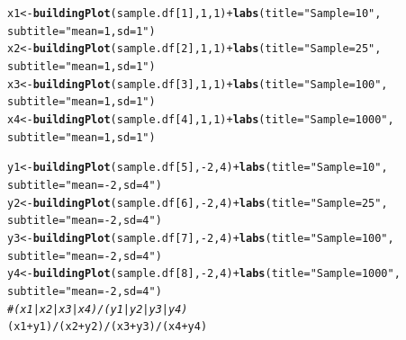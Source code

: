 \documentclass{article}\usepackage[]{graphicx}\usepackage[]{color}
\makeatletter
\newcommand{\hlnum}[1]{\textcolor[rgb]{0.686,0.059,0.569}{#1}}%
\newcommand{\hlstr}[1]{\textcolor[rgb]{0.192,0.494,0.8}{#1}}%
\newcommand{\hlcom}[1]{\textcolor[rgb]{0.678,0.584,0.686}{\textit{#1}}}%
\newcommand{\hlopt}[1]{\textcolor[rgb]{0,0,0}{#1}}%
\newcommand{\hlstd}[1]{\textcolor[rgb]{0.345,0.345,0.345}{#1}}%
\newcommand{\hlkwb}[1]{\textcolor[rgb]{0.69,0.353,0.396}{#1}}%
\newcommand{\hlkwc}[1]{\textcolor[rgb]{0.333,0.667,0.333}{#1}}%
\newcommand{\hlkwd}[1]{\textcolor[rgb]{0.737,0.353,0.396}{\textbf{#1}}}%
\newenvironment{kframe}{%
 \def\at@end@of@kframe{}%
 \ifinner\ifhmode%
  \def\at@end@of@kframe{\end{minipage}}%
  \begin{minipage}{\columnwidth}%
 \fi\fi%
 \def\FrameCommand##1{\hskip\@totalleftmargin \hskip-\fboxsep
 \colorbox{shadecolor}{##1}\hskip-\fboxsep
     \hskip-\linewidth \hskip-\@totalleftmargin \hskip\columnwidth}%
 \MakeFramed {\advance\hsize-\width
   \@totalleftmargin\z@ \linewidth\hsize
   \@setminipage}}%
 {\par\unskip\endMakeFramed%
 \at@end@of@kframe}
\newenvironment{knitrout}{}{} %
\makeatother
\begin{document}
\begin{enumerate}
\begin{enumerate}
\begin{knitrout}
\begin{kframe}
\begin{alltt}
        \hlstd{x1}\hlkwb{<-}\hlkwd{buildingPlot}\hlstd{(sample.df[}\hlnum{1}\hlstd{],} \hlnum{1}\hlstd{,} \hlnum{1}\hlstd{)}\hlopt{+}\hlkwd{labs}\hlstd{(}\hlkwc{title}\hlstd{=}\hlstr{"Sample=10"}\hlstd{,}
                                                  \hlkwc{subtitle} \hlstd{=} \hlstr{"mean=1, sd=1"}\hlstd{)}
        \hlstd{x2}\hlkwb{<-}\hlkwd{buildingPlot}\hlstd{(sample.df[}\hlnum{2}\hlstd{],} \hlnum{1}\hlstd{,} \hlnum{1}\hlstd{)}\hlopt{+}\hlkwd{labs}\hlstd{(}\hlkwc{title}\hlstd{=}\hlstr{"Sample=25"}\hlstd{,}
                                                  \hlkwc{subtitle} \hlstd{=} \hlstr{"mean=1, sd=1"}\hlstd{)}
        \hlstd{x3}\hlkwb{<-}\hlkwd{buildingPlot}\hlstd{(sample.df[}\hlnum{3}\hlstd{],} \hlnum{1}\hlstd{,} \hlnum{1}\hlstd{)}\hlopt{+}\hlkwd{labs}\hlstd{(}\hlkwc{title}\hlstd{=}\hlstr{"Sample=100"}\hlstd{,}
                                                  \hlkwc{subtitle} \hlstd{=} \hlstr{"mean=1, sd=1"}\hlstd{)}
        \hlstd{x4}\hlkwb{<-}\hlkwd{buildingPlot}\hlstd{(sample.df[}\hlnum{4}\hlstd{],} \hlnum{1}\hlstd{,} \hlnum{1}\hlstd{)}\hlopt{+}\hlkwd{labs}\hlstd{(}\hlkwc{title}\hlstd{=}\hlstr{"Sample=1000"}\hlstd{,}
                                                  \hlkwc{subtitle} \hlstd{=} \hlstr{"mean=1, sd=1"}\hlstd{)}

        \hlstd{y1}\hlkwb{<-}\hlkwd{buildingPlot}\hlstd{(sample.df[}\hlnum{5}\hlstd{],} \hlopt{-}\hlnum{2}\hlstd{,} \hlnum{4}\hlstd{)}\hlopt{+}\hlkwd{labs}\hlstd{(}\hlkwc{title}\hlstd{=}\hlstr{"Sample=10"}\hlstd{,}
                                                  \hlkwc{subtitle} \hlstd{=} \hlstr{"mean=-2, sd=4"}\hlstd{)}
        \hlstd{y2}\hlkwb{<-}\hlkwd{buildingPlot}\hlstd{(sample.df[}\hlnum{6}\hlstd{],} \hlopt{-}\hlnum{2}\hlstd{,} \hlnum{4}\hlstd{)}\hlopt{+}\hlkwd{labs}\hlstd{(}\hlkwc{title}\hlstd{=}\hlstr{"Sample=25"}\hlstd{,}
                                                  \hlkwc{subtitle} \hlstd{=} \hlstr{"mean=-2, sd=4"}\hlstd{)}
        \hlstd{y3}\hlkwb{<-}\hlkwd{buildingPlot}\hlstd{(sample.df[}\hlnum{7}\hlstd{],} \hlopt{-}\hlnum{2}\hlstd{,} \hlnum{4}\hlstd{)}\hlopt{+}\hlkwd{labs}\hlstd{(}\hlkwc{title}\hlstd{=}\hlstr{"Sample=100"}\hlstd{,}
                                                  \hlkwc{subtitle} \hlstd{=} \hlstr{"mean=-2, sd=4"}\hlstd{)}
        \hlstd{y4}\hlkwb{<-}\hlkwd{buildingPlot}\hlstd{(sample.df[}\hlnum{8}\hlstd{],} \hlopt{-}\hlnum{2}\hlstd{,} \hlnum{4}\hlstd{)}\hlopt{+}\hlkwd{labs}\hlstd{(}\hlkwc{title}\hlstd{=}\hlstr{"Sample=1000"}\hlstd{,}
                                                  \hlkwc{subtitle} \hlstd{=} \hlstr{"mean=-2, sd=4"}\hlstd{)}
        \hlcom{#(x1|x2|x3|x4)/(y1|y2|y3|y4)}
        \hlstd{(x1}\hlopt{+}\hlstd{y1)}\hlopt{/}\hlstd{(x2}\hlopt{+}\hlstd{y2)}\hlopt{/}\hlstd{(x3}\hlopt{+}\hlstd{y3)}\hlopt{/}\hlstd{(x4}\hlopt{+}\hlstd{y4)}
\end{alltt}
\end{kframe}
\end{knitrout}


\end{enumerate}
\end{enumerate}
\end{document}
